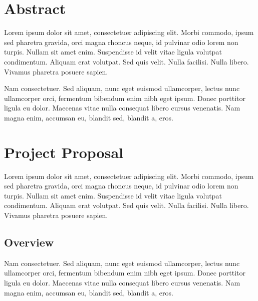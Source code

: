 \documentclass[10pt]{article}
\begin{document}
\begin{multicols}{2}

\section*{Abstract}
Lorem ipsum dolor sit amet, consectetuer adipiscing elit. Morbi commodo, ipsum sed pharetra gravida, orci magna rhoncus neque, id pulvinar odio lorem non turpis. Nullam sit amet enim. Suspendisse id velit vitae ligula volutpat condimentum. Aliquam erat volutpat. Sed quis velit. Nulla facilisi. Nulla libero. Vivamus pharetra posuere sapien. 

Nam consectetuer. Sed aliquam, nunc eget euismod ullamcorper, lectus nunc ullamcorper orci, fermentum bibendum enim nibh eget ipsum. Donec porttitor ligula eu dolor. Maecenas vitae nulla consequat libero cursus venenatis. Nam magna enim, accumsan eu, blandit sed, blandit a, eros.

\section*{Project Proposal}
Lorem ipsum dolor sit amet, consectetuer adipiscing elit. Morbi commodo, ipsum sed pharetra gravida, orci magna rhoncus neque, id pulvinar odio lorem non turpis. Nullam sit amet enim. Suspendisse id velit vitae ligula volutpat condimentum. Aliquam erat volutpat. Sed quis velit. Nulla facilisi. Nulla libero. Vivamus pharetra posuere sapien.

\subsection*{Overview}
Nam consectetuer. Sed aliquam, nunc eget euismod ullamcorper, lectus nunc ullamcorper orci, fermentum bibendum enim nibh eget ipsum. Donec porttitor ligula eu dolor. Maecenas vitae nulla consequat libero cursus venenatis. Nam magna enim, accumsan eu, blandit sed, blandit a, eros. 


\end{multicols}
\end{document}
